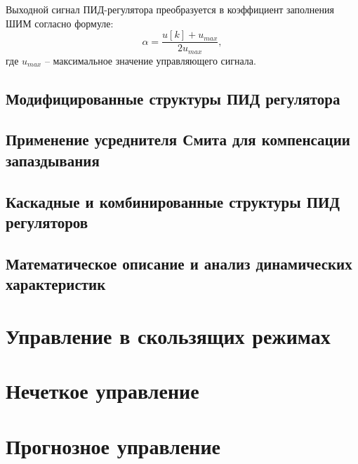 Выходной сигнал ПИД-регулятора преобразуется в коэффициент заполнения ШИМ согласно формуле:
\begin{equation*}
\alpha = \frac{u[k] + u_{max}}{2u_{max}},
\end{equation*}
где $u_{max}$ -- максимальное значение управляющего сигнала.

\subsection{Модифицированные структуры ПИД регулятора}\label{subsec:ch3/sec1/sub3}
\subsection{Применение усреднителя Смита для компенсации запаздывания}\label{subsec:ch3/sec1/sub4}
\subsection{Каскадные и комбинированные структуры ПИД регуляторов}\label{subsec:ch3/sec1/sub5}
\subsection{Математическое описание и анализ динамических характеристик}\label{subsec:ch3/sec1/sub6}

\section{Управление в скользящих режимах}\label{sec:ch3/sec2}

\section{Нечеткое управление}\label{sec:ch3/sec3}

\section{Прогнозное управление}\label{sec:ch3/sec4}
